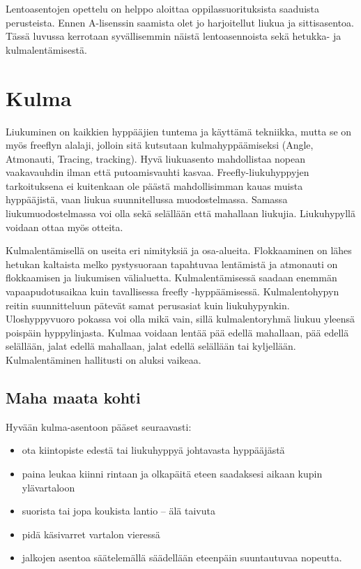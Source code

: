 
Lentoasentojen opettelu on helppo aloittaa oppilassuorituksista saaduista perusteista. Ennen A-lisenssin saamista olet jo harjoitellut liukua ja sittisasentoa. Tässä luvussa kerrotaan syvällisemmin näistä lentoasennoista sekä hetukka- ja kulmalentämisestä. 

\section{ Kulma }
\label{freefly-lentoasennot-kulma}


Liukuminen on kaikkien hyppääjien tuntema ja käyttämä tekniikka, mutta se on myös freeflyn alalaji, jolloin sitä kutsutaan kulmahyppäämiseksi (Angle, Atmonauti, Tracing, tracking). Hyvä liukuasento mahdollistaa nopean vaakavauhdin ilman että putoamisvauhti kasvaa. Freefly-liukuhyppyjen tarkoituksena ei kuitenkaan ole päästä mahdollisimman kauas muista hyppääjistä, vaan liukua suunnitellussa muodostelmassa. Samassa liukumuodostelmassa voi olla sekä selällään että mahallaan liukujia. Liukuhypyllä voidaan ottaa myös otteita. 


Kulmalentämisellä on useita eri nimityksiä ja osa-alueita. Flokkaaminen on lähes hetukan kaltaista melko pystysuoraan tapahtuvaa lentämistä ja atmonauti on flokkaamisen ja liukumisen välialuetta. Kulmalentämisessä saadaan enemmän vapaapudotusaikaa kuin tavallisessa freefly -hyppäämisessä. Kulmalentohypyn reitin suunnitteluun pätevät samat perusasiat kuin liukuhypynkin. Uloshyppyvuoro pokassa voi olla mikä vain, sillä kulmalentoryhmä liukuu yleensä poispäin hyppylinjasta. Kulmaa voidaan lentää pää edellä mahallaan, pää edellä selällään, jalat edellä mahallaan, jalat edellä selällään tai kyljellään. Kulmalentäminen hallitusti on aluksi vaikeaa. 

\subsection{ Maha maata kohti }
\label{freefly-lentoasennot-maha-maata-kohti}


Hyvään kulma-asentoon pääset seuraavasti: 

\begin{itemize}
\item  ota kiintopiste edestä tai liukuhyppyä johtavasta hyppääjästä 
\item  paina leukaa kiinni rintaan ja olkapäitä eteen saadaksesi aikaan kupin ylävartaloon 
\item  suorista tai jopa koukista lantio – älä taivuta 
\item  pidä käsivarret vartalon vieressä 
\item  jalkojen asentoa säätelemällä säädellään eteenpäin suuntautuvaa nopeutta. 
\end{itemize}

